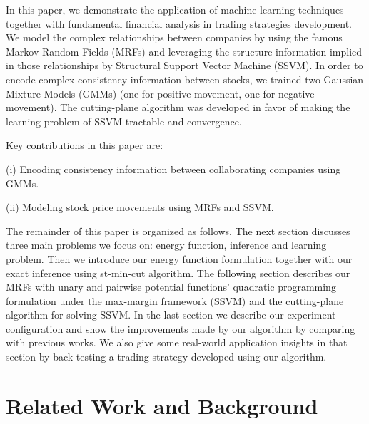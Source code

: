 In this paper, we demonstrate the application of machine learning
techniques together with fundamental financial analysis in
trading strategies development. We model the complex
relationships between companies by using the famous Markov Random
Fields (MRFs) and leveraging the structure information implied in
those relationships by Structural Support Vector Machine (SSVM).
In order to encode complex consistency information between
stocks, we trained two Gaussian Mixture Models (GMMs) (one for
positive movement, one for negative movement). The cutting-plane
algorithm was developed in favor of making the learning problem
of SSVM tractable and convergence.

Key contributions in this paper are:

(i) Encoding consistency information between collaborating
companies using GMMs.

(ii) Modeling stock price movements using MRFs and SSVM.

The remainder of this paper is organized as follows. The next
section discusses three main problems we focus on: energy
function, inference and learning problem. Then we introduce our
energy function formulation together with our exact inference
using st-min-cut algorithm. The following section describes our
MRFs with unary and pairwise potential functions' quadratic
programming formulation under the max-margin framework (SSVM) and
the cutting-plane algorithm for solving SSVM. In the last section
we describe our experiment configuration and show the improvements
made by our algorithm by comparing with previous works. We also
give some real-world application insights in that section by back
testing a trading strategy developed using our algorithm.

\section{Related Work and Background}
\label{sec:RelatedWorks}
